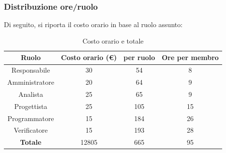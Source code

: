 \documentclass{article}
\begin{document}
        \subsubsection{Distribuzione ore/ruolo}
        Di seguito, si riporta il costo orario in base al ruolo assunto:
        \begin{table}[!h]
            \begin{center}
                \begin{tabular}{ |c|c|c|c| }
                    \hline
                    \textbf{Ruolo}          & \textbf{Costo orario} (\euro) &  \textbf{per ruolo}   & \textbf{Ore per membro} \\
                    \hline
                    Responsabile   & 30           &     54       &       8        \\
                    Amministratore & 20           &     64       &       9        \\
                    Analista       & 25           &     65       &       9       \\
                    Progettista    & 25           &     105      &       15       \\
                    Programmatore  & 15           &     184      &       26       \\
                    Verificatore   & 15           &     193      &       28       \\
                    \hline
                    \textbf{Totale}         &    12805    &     665       &       95       \\
                    \hline
                \end{tabular}
                \caption{Costo orario e totale}
            \end{center}
        \end{table}
\end{document}
